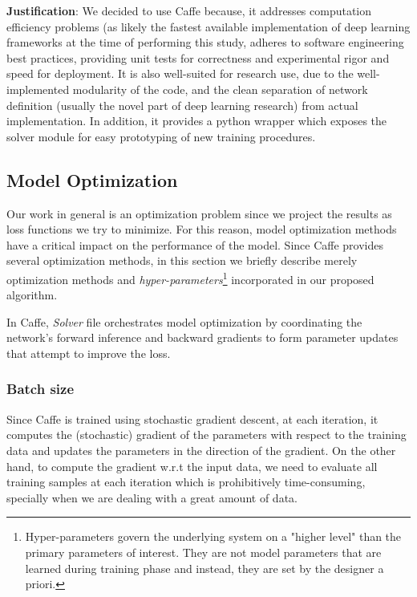 \textbf{Justification}: We decided to use Caffe because, it addresses computation efficiency problems (as likely the fastest available implementation of deep learning frameworks at the time of performing this study, adheres to software engineering best practices, providing unit tests for correctness and experimental rigor and speed for deployment. It is also well-suited for research use, due to the well-implemented modularity of the code, and the clean separation of network definition (usually the novel part of deep learning research) from actual implementation\cite{jia2014caffe}. In addition, it provides a python wrapper which exposes the solver module for easy prototyping of new training procedures. 

\subsection{Model Optimization}

Our work in general is an optimization problem since we project the results as loss functions we try to minimize. For this reason, model optimization methods have a critical impact on the performance of the model. Since Caffe provides several optimization methods, in this section we briefly describe merely optimization methods and \textit{hyper-parameters}\footnote{Hyper-parameters govern the underlying system on a "higher level" than the primary parameters of interest. They are not model parameters that are learned during training phase and instead, they are set by the designer a priori.} incorporated in our proposed algorithm.  

\indent In Caffe, \textit{Solver} file  orchestrates model optimization by coordinating the network's forward inference and backward gradients to form parameter updates that attempt to improve the loss. 

\subsubsection{Batch size}

Since Caffe is trained using stochastic gradient descent, at each iteration, it computes the (stochastic) gradient of the parameters with respect to the training data and updates the parameters in the direction of the gradient. On the other hand, to compute the gradient w.r.t the input data, we need to evaluate all training samples at each iteration which is prohibitively time-consuming, specially when we are dealing with a great amount of data. 

